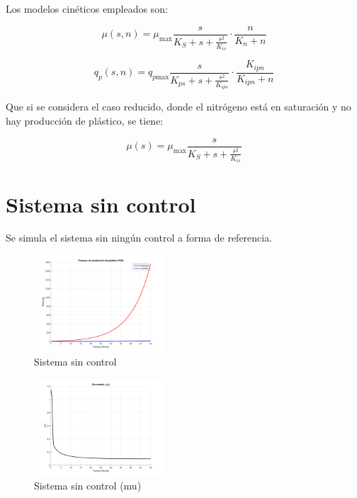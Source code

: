 \documentclass[letterpaper, 10 pt, conference]{ieeeconf}  %
\begin{document}
\vspace{0.35cm}

Los modelos cinéticos empleados son:

\begin{equation*}
\mu(s,n) = \mu_{\text{max}} \frac{s}{K_S + s + \frac{s^2}{K_{is}}} \cdot \frac{n}{K_n + n}
\end{equation*}

\begin{equation*}
q_p(s,n) = q_{p\text{max}} \frac{s}{K_{ps} + s + \frac{s^2}{K_{ips}}} \cdot \frac{K_{ipn}}{K_{ipn} + n}
\end{equation*}

Que si se considera el caso reducido, donde el nitrógeno está en saturación y no hay producción de plástico, se tiene:

\begin{equation*}
\mu(s) = \mu_{\text{max}} \frac{s}{K_S + s + \frac{s^2}{K_{is}}} 
\end{equation*}

\section{Sistema sin control}  
Se simula el sistema sin ningún control a forma de referencia.

\begin{figure}[H]
  \centering
  \includegraphics[width=0.43\textwidth]{./Images_tp3/sin_control.png}
  \caption{Sistema sin control}
\end{figure}
\begin{figure}[H]
  \centering
  \includegraphics[width=0.43\textwidth]{./Images_tp3/sin_control_mu.png}
  \caption{Sistema sin control (mu)}
\end{figure}
\end{document}

